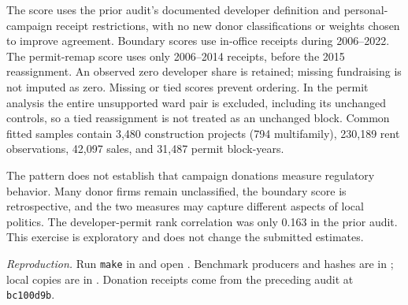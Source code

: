 The score uses the prior audit's documented developer definition and personal-campaign receipt restrictions, with no new donor classifications or weights chosen to improve agreement. Boundary scores use in-office receipts during 2006--2022. The permit-remap score uses only 2006--2014 receipts, before the 2015 reassignment. An observed zero developer share is retained; missing fundraising is not imputed as zero. Missing or tied scores prevent ordering. In the permit analysis the entire unsupported ward pair is excluded, including its unchanged controls, so a tied reassignment is not treated as an unchanged block. Common fitted samples contain 3,480 construction projects (794 multifamily), 230,189 rent observations, 42,097 sales, and 31,487 permit block-years.

The pattern does not establish that campaign donations measure regulatory behavior. Many donor firms remain unclassified, the boundary score is retrospective, and the two measures may capture different aspects of local politics. The developer-permit rank correlation was only 0.163 in the prior audit. This exercise is exploratory and does not change the submitted estimates.

\textit{Reproduction.} Run \texttt{make} in
 and open
. Benchmark producers and hashes are in
; local copies are in .
Donation receipts come from the preceding audit at \texttt{bc100d9b}.
